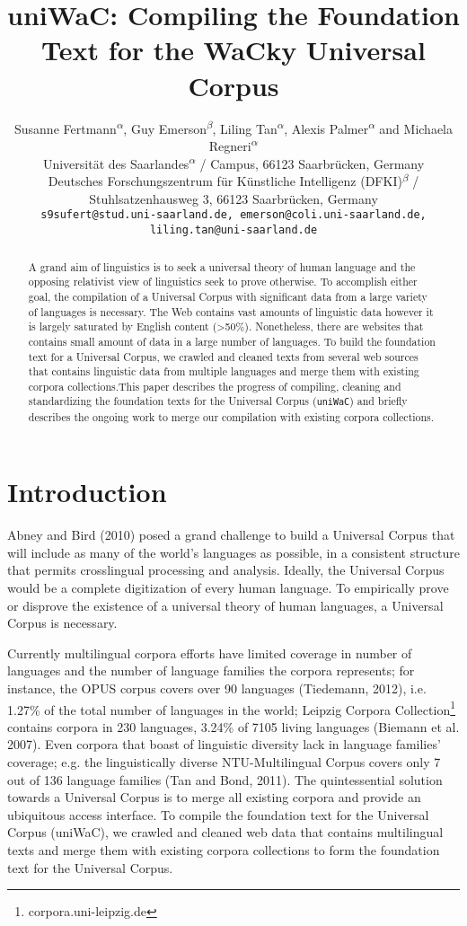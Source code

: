 \documentclass[11pt]{article}
\title{uniWaC: Compiling the Foundation Text for the WaCky Universal Corpus}
\author{Susanne Fertmann\textsuperscript{$\alpha$}, Guy Emerson\textsuperscript{$\beta$}, Liling Tan\textsuperscript{$\alpha$}, Alexis Palmer\textsuperscript{$\alpha$} and Michaela Regneri\textsuperscript{$\alpha$} \\
  Universit{\"a}t des Saarlandes\textsuperscript{$\alpha$} / Campus, 66123 Saarbrücken, Germany \\
  Deutsches Forschungszentrum f{\"u}r Künstliche Intelligenz (DFKI)\textsuperscript{$\beta$} / \\ Stuhlsatzenhausweg 3, 66123 Saarbrücken, Germany \\
  {\tt s9sufert@stud.uni-saarland.de, emerson@coli.uni-saarland.de,} \\
  {\tt liling.tan@uni-saarland.de}}
\date{}
\begin{document}
\maketitle
\begin{abstract}
A grand aim of linguistics is to seek a universal theory of human language and the opposing relativist view of linguistics seek to prove otherwise. To accomplish either goal, the compilation of a Universal Corpus with significant data from a large variety of languages is necessary. The Web contains vast amounts of linguistic data however it is largely saturated by English content (\textgreater50\%). Nonetheless, there are websites that contains small amount of data in a large number of languages. To build the foundation text for a Universal Corpus, we crawled and cleaned texts from several web sources that contains linguistic data from multiple languages and merge them with existing corpora collections.This paper describes the progress of compiling, cleaning and standardizing the foundation texts for the Universal Corpus (\texttt{uniWaC}) and briefly describes the ongoing work to merge our compilation with existing corpora collections.
\end{abstract}

\section{Introduction}
Abney and Bird (2010) posed a grand challenge to build a Universal Corpus that will include as many of the world's languages as possible, in a consistent structure that permits crosslingual processing and analysis. Ideally, the Universal Corpus would be a complete digitization of every human language. To empirically prove or disprove the existence of a universal theory of human languages, a Universal Corpus is necessary. 

Currently multilingual corpora efforts have limited coverage in number of languages and the number of language families the corpora represents; for instance, the OPUS corpus covers over 90 languages (Tiedemann, 2012), i.e. 1.27\% of the total number of languages in the world; Leipzig Corpora
Collection\footnote{corpora.uni-leipzig.de} contains corpora in 230 languages, 3.24\% of 7105 living languages (Biemann et al. 2007). Even corpora that boast of linguistic diversity lack in language families’ coverage; e.g. the linguistically diverse NTU-Multilingual Corpus covers only 7 out of 136 language families (Tan and Bond, 2011). The quintessential solution towards a Universal Corpus is to merge all existing corpora and provide an ubiquitous access interface. To compile the foundation text for the Universal Corpus (uniWaC), we crawled and cleaned web data that contains multilingual texts and merge them with existing corpora collections to form the foundation text for the Universal Corpus.
\end{document}
